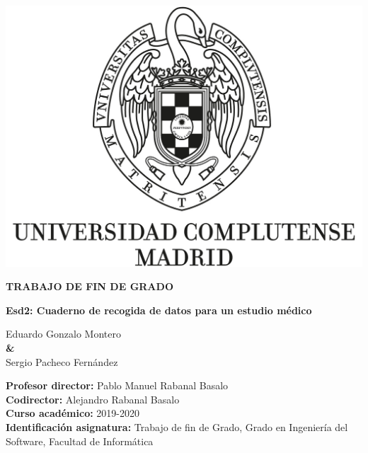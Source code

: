 \documentclass{report}
\begin{document}
    \begin{titlepage}
        \centering
        {\includegraphics[width=1\textwidth]{images/logo_UCM}}
    
        \vspace{1cm}
        
        {\huge\textbf{TRABAJO DE FIN DE GRADO \\ }  }

        \vspace{0.5cm}
        
        {\huge\textbf{Esd2: Cuaderno de recogida de datos para un estudio médico}}
        
        \vspace{1.4cm}
    
        {\Large Eduardo Gonzalo Montero \\}
        \vspace{0.5cm}
        {\textbf \&\\}
        \vspace{0.5cm}
        {\Large Sergio Pacheco Fernández \\}
        
        \vspace{1.4cm}
        
        \raggedright
        {\Large \textbf{Profesor director:} Pablo Manuel Rabanal Basalo \\}
        \vspace{0.1cm}
        {\Large \textbf{Codirector:} Alejandro Rabanal Basalo \\}
        \vspace{0.1cm}
        {\Large\textbf {Curso académico:} 2019-2020 \\}
        \vspace{0.1cm}
        {\Large\textbf {Identificación asignatura: }Trabajo de fin de Grado, Grado en Ingeniería del Software, Facultad de Informática \\}
   

\end{titlepage}
\end{document}
